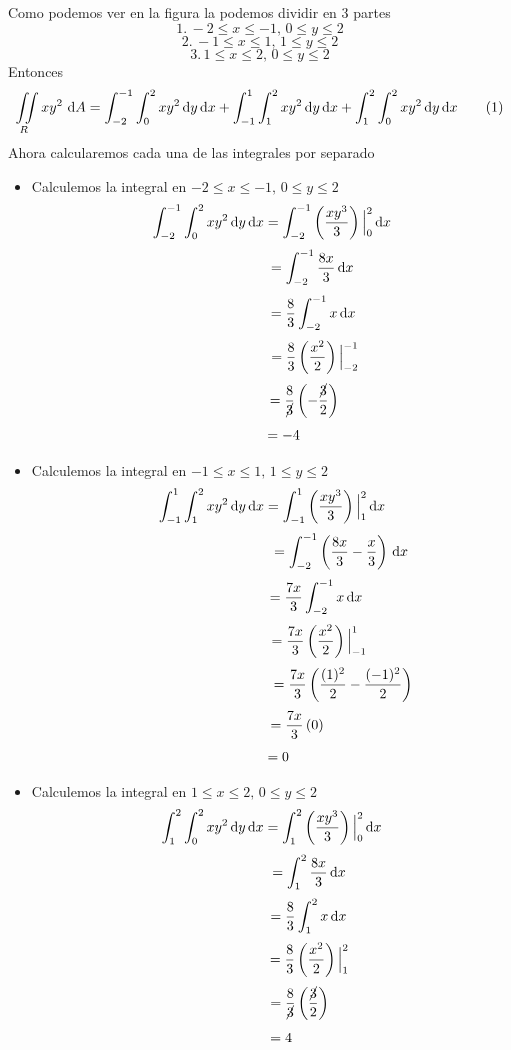 \documentclass[11pt]{report}
\begin{document}
Como podemos ver en la figura la podemos dividir en 3 partes
\[1.\, -2 \leq x \leq -1, \, 0 \leq y \leq 2\]
\[2.\, -1 \leq x \leq 1, \, 1 \leq y \leq 2\]
\[3.\, 1 \leq x \leq 2, \, 0 \leq y \leq 2 \]
Entonces
\[{\displaystyle \iint \limits_R } \, xy^2 \, \, \text dA =
\int^{-1}_{-2} \int^{2}_{0} xy^2 \, \text dy \, \text dx +
\int^{1}_{-1} \int^{2}_{1} xy^2 \, \text dy  \, \text dx +
\int^{2}_{1} \int^{2}_{0} xy^2 \, \text dy \, \text dx \qquad (1)\]
Ahora calcularemos cada una de las integrales por separado
\begin{itemize}
\item Calculemos la integral en $ -2 \leq x \leq -1, \, 0 \leq y \leq 2$
\[\int^{-1}_{-2} \int^{2}_{0} xy^2 \, \text dy \, \text dx
= \int^{-1}_{-2} \left(\frac{xy^3}{3}\right)\Big|^{2}_{0} \, \text dx \]
\[\hspace{2.05cm}= \int^{-1}_{-2} \frac{8x}{3} \, \text dx \]
\[\hspace{2.1cm}= \frac{8}{3} \int^{-1}_{-2} x \, \text dx \]
\[\hspace{2.2cm}= \frac{8}{3} \left(\frac{x^2}{2}\right)\Big|^{-1}_{-2} \]
\[\hspace{1.65cm}= \frac{8}{\cancel{3}}\left(-\frac{\cancel{3}}{2}\right)\]
\[\hspace{0.6cm}= -4\]

\item Calculemos la integral en $-1 \leq x \leq 1, \, 1 \leq y \leq 2$
\[\int^{1}_{-1} \int^{2}_{1} xy^2 \, \text dy  \, \text dx
= \int^{1}_{-1} \left(\frac{xy^3}{3}\right)\Big|^{2}_{1} \, \text dx\]
\[\hspace{3.5cm}= \int^{-1}_{-2}\left(\frac{8x}{3} - \frac{x}{3} \right) \, \text dx \]
\[\hspace{2.28cm}= \frac{7x}{3}\int^{-1}_{-2} x \, \text dx \]
\[\hspace{2.4cm}= \frac{7x}{3}\left(\frac{x^2}{2}\right)\Big|^{1}_{-1}\]
\[\hspace{3.63cm}= \frac{7x}{3}\left(\frac{(1)^2}{2} - \frac{(-1)^2}{2}\right)\]
\[\hspace{1.28cm}= \frac{7x}{3}\left(0\right)\]
\[\hspace{0.34cm}= 0\]

\item Calculemos la integral en $1 \leq x \leq 2, \, 0 \leq y \leq 2  $
\[\int^{2}_{1} \int^{2}_{0} xy^2 \, \text dy \, \text dx
= \int^{2}_{1} \left(\frac{xy^3}{3}\right)\Big|^{2}_{0} \, \text dx \]
\[\hspace{1.89cm}= \int^{2}_{1} \frac{8x}{3} \, \text dx \]
\[\hspace{1.89cm}= \frac{8}{3} \int^{2}_{1} x \, \text dx \]
\[\hspace{1.9cm}= \frac{8}{3} \left(\frac{x^2}{2}\right)\Big|^{2}_{1} \]
\[\hspace{1.4cm}= \frac{8}{\cancel{3}}\left(\frac{\cancel{3}}{2}\right)\]
\[\hspace{0.46cm}= 4\]
\end{itemize}
\end{document}
